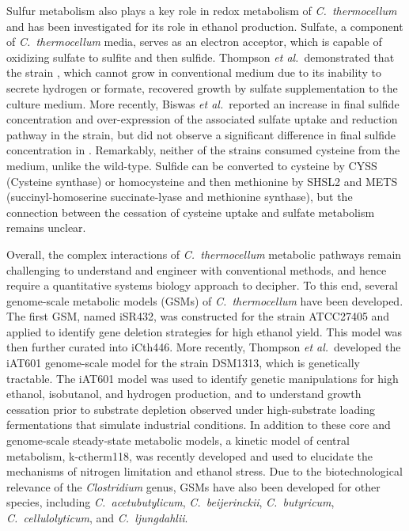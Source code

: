 Sulfur metabolism also plays a key role in redox metabolism of \textit{C.~thermocellum} and has been investigated for its role in ethanol production. Sulfate, a component of \textit{C.~thermocellum} media, serves as an electron acceptor, which is capable of oxidizing sulfate to sulfite and then sulfide. Thompson \textit{et al.}\citep{thompson2015}\ demonstrated that the strain , which cannot grow in conventional medium due to its inability to secrete hydrogen or formate, recovered growth by sulfate supplementation to the culture medium. More recently, Biswas \textit{et al.}\citep{biswas2017}\ reported an increase in final sulfide concentration and over-expression of the associated sulfate uptake and reduction pathway in the  strain, but did not observe a significant difference in final sulfide concentration in . Remarkably, neither of the strains consumed cysteine from the medium, unlike the wild-type. Sulfide can be converted to cysteine by CYSS (Cysteine synthase) or homocysteine and then methionine by SHSL2 and METS (succinyl-homoserine succinate-lyase and methionine synthase), but the connection between the cessation of cysteine uptake and sulfate metabolism remains unclear.

Overall, the complex interactions of \textit{C.~thermocellum} metabolic pathways remain challenging to understand and engineer with conventional methods, and hence require a quantitative systems biology approach to decipher.
To this end, several genome-scale metabolic models (GSMs) of \textit{C.~thermocellum} have been developed. The first GSM, named iSR432, was constructed for the strain ATCC27405 and applied to identify gene deletion strategies for high ethanol yield. \citep{roberts2010}
This model was then further curated into iCth446. \citep{dash2017}
More recently, Thompson \textit{et al.}\ developed the iAT601 genome-scale model \citep{thompson2016} for the strain DSM1313, which is genetically tractable.\citep{argyros2011}
The iAT601 model was used to identify genetic manipulations for high ethanol, isobutanol, and hydrogen production,\citep{thompson2016} and to understand growth cessation prior to substrate depletion observed under high-substrate loading fermentations that simulate industrial conditions.\citep{thompson2017}
In addition to these core and genome-scale steady-state metabolic models, a kinetic model of central metabolism, k-ctherm118, was recently developed and used to elucidate the mechanisms of nitrogen limitation and ethanol stress.\citep{dash2017} Due to the biotechnological relevance of the \textit{Clostridium} genus, GSMs have also been developed for other species,\citep{dash2016} including
\textit{C.~acetubutylicum},\citep{lee2018, senger2008, salimi2010, mcanulty2012, wallenius2013, dash2014, yoo2015}
\textit{C.~beijerinckii},\citep{milne2011}
\textit{C.~butyricum},\citep{serrano2017}
\textit{C.~cellulolyticum},\citep{salimi2010}
and \textit{C.~ljungdahlii}.\citep{nagarajan2013}



